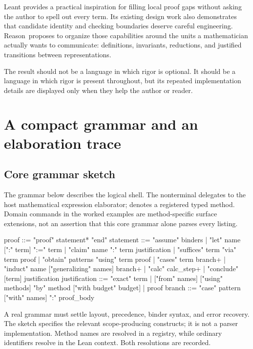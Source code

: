 \documentclass[11pt,a4paper]{article}
\newcommand{\Reason}{\textsf{Reason}}
\newcommand{\code}[1]{\texttt{\detokenize{#1}}}
\theoremstyle{remark}
\begin{document}
Leant provides a practical inspiration for filling local proof gaps without asking the author to spell out every term. Its existing design work also demonstrates that candidate identity and checking boundaries deserve careful engineering. \Reason\ proposes to organize those capabilities around the units a mathematician actually wants to communicate: definitions, invariants, reductions, and justified transitions between representations.

The result should not be a language in which rigor is optional. It should be a language in which rigor is present throughout, but its repeated implementation details are displayed only when they help the author or reader.

\appendix
\section{A compact grammar and an elaboration trace}\label{app:grammar}

\subsection{Core grammar sketch}

The grammar below describes the logical shell. The \code{term} nonterminal delegates to the host mathematical expression elaborator; \code{method} denotes a registered typed method. Domain commands in the worked examples are method-specific surface extensions, not an assertion that this core grammar alone parses every listing.
\begin{Code}
proof       ::= "proof" statement* "end"
statement   ::= "assume" binders
              | "let" name [":" term] ":=" term
              | "claim" name ":" term justification
              | "suffices" term "via" term proof
              | "obtain" patterns "using" term proof
              | "cases" term branch+
              | "induct" name ["generalizing" names] branch+
              | "calc" calc_step+
              | "conclude" [term] justification
justification ::= "exact" term
                | ["from" names] ["using" methods]
                  "by" method ["with budget" budget]
                | proof
branch      ::= "case" pattern ["with" names] ":" proof_body
\end{Code}
A real grammar must settle layout, precedence, binder syntax, and error recovery. The sketch specifies the relevant scope-producing constructs; it is not a parser implementation. Method names are resolved in a registry, while ordinary identifiers resolve in the Lean context. Both resolutions are recorded.
\end{document}
